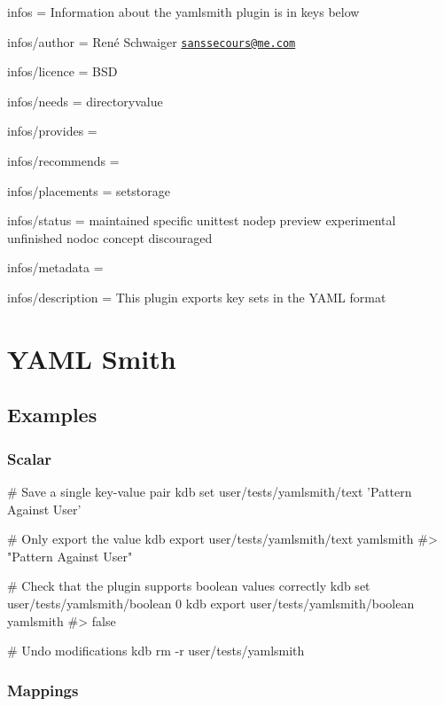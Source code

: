 
\begin{DoxyItemize}
\item infos = Information about the yamlsmith plugin is in keys below
\item infos/author = René Schwaiger \href{mailto:sanssecours@me.com}{\tt sanssecours@me.\+com}
\item infos/licence = B\+SD
\item infos/needs = directoryvalue
\item infos/provides =
\item infos/recommends =
\item infos/placements = setstorage
\item infos/status = maintained specific unittest nodep preview experimental unfinished nodoc concept discouraged
\item infos/metadata =
\item infos/description = This plugin exports key sets in the Y\+A\+ML format
\end{DoxyItemize}\hypertarget{md_src_plugins_yamlsmith_README_src_plugins_yamlsmith_README_md}{}\section{Y\+A\+M\+L Smith}\label{md_src_plugins_yamlsmith_README_src_plugins_yamlsmith_README_md}
\subsection*{Examples}

\subsubsection*{Scalar}


\begin{DoxyCode}
# Save a single key-value pair
kdb set user/tests/yamlsmith/text 'Pattern Against User'

# Only export the value
kdb export user/tests/yamlsmith/text yamlsmith
#> "Pattern Against User"

# Check that the plugin supports boolean values correctly
kdb set user/tests/yamlsmith/boolean 0
kdb export user/tests/yamlsmith/boolean yamlsmith
#> false

# Undo modifications
kdb rm -r user/tests/yamlsmith
\end{DoxyCode}


\subsubsection*{Mappings}


